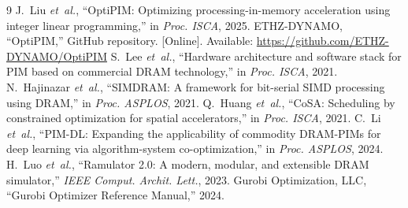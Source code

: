 \documentclass[conference]{IEEEtran}
\begin{document}
\begin{thebibliography}{9}
 J.~Liu \emph{et~al.}, ``OptiPIM: Optimizing processing-in-memory acceleration using integer linear programming,'' in \emph{Proc. ISCA}, 2025.
 ETHZ-DYNAMO, ``OptiPIM,'' GitHub repository. [Online]. Available: \url{https://github.com/ETHZ-DYNAMO/OptiPIM}
 S.~Lee \emph{et~al.}, ``Hardware architecture and software stack for PIM based on commercial DRAM technology,'' in \emph{Proc. ISCA}, 2021.
 N.~Hajinazar \emph{et~al.}, ``SIMDRAM: A framework for bit-serial SIMD processing using DRAM,'' in \emph{Proc. ASPLOS}, 2021.
 Q.~Huang \emph{et~al.}, ``CoSA: Scheduling by constrained optimization for spatial accelerators,'' in \emph{Proc. ISCA}, 2021.
 C.~Li \emph{et~al.}, ``PIM-DL: Expanding the applicability of commodity DRAM-PIMs for deep learning via algorithm-system co-optimization,'' in \emph{Proc. ASPLOS}, 2024.
 H.~Luo \emph{et~al.}, ``Ramulator 2.0: A modern, modular, and extensible DRAM simulator,'' \emph{IEEE Comput. Archit. Lett.}, 2023.
 Gurobi Optimization, LLC, ``Gurobi Optimizer Reference Manual,'' 2024.
\end{thebibliography}
\end{document}
